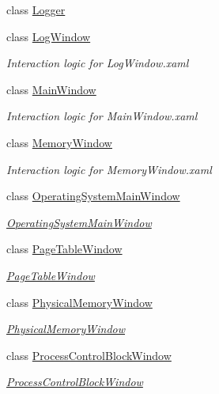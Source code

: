 \begin{DoxyCompactItemize}
class \hyperlink{class_c_p_u___o_s___simulator_1_1_logger}{Logger}
\item 
class \hyperlink{class_c_p_u___o_s___simulator_1_1_log_window}{Log\+Window}
\begin{DoxyCompactList}\small\item\em Interaction logic for Log\+Window.\+xaml \end{DoxyCompactList}\item 
class \hyperlink{class_c_p_u___o_s___simulator_1_1_main_window}{Main\+Window}
\begin{DoxyCompactList}\small\item\em Interaction logic for Main\+Window.\+xaml \end{DoxyCompactList}\item 
class \hyperlink{class_c_p_u___o_s___simulator_1_1_memory_window}{Memory\+Window}
\begin{DoxyCompactList}\small\item\em Interaction logic for Memory\+Window.\+xaml \end{DoxyCompactList}\item 
class \hyperlink{class_c_p_u___o_s___simulator_1_1_operating_system_main_window}{Operating\+System\+Main\+Window}
\begin{DoxyCompactList}\small\item\em \hyperlink{class_c_p_u___o_s___simulator_1_1_operating_system_main_window}{Operating\+System\+Main\+Window} \end{DoxyCompactList}\item 
class \hyperlink{class_c_p_u___o_s___simulator_1_1_page_table_window}{Page\+Table\+Window}
\begin{DoxyCompactList}\small\item\em \hyperlink{class_c_p_u___o_s___simulator_1_1_page_table_window}{Page\+Table\+Window} \end{DoxyCompactList}\item 
class \hyperlink{class_c_p_u___o_s___simulator_1_1_physical_memory_window}{Physical\+Memory\+Window}
\begin{DoxyCompactList}\small\item\em \hyperlink{class_c_p_u___o_s___simulator_1_1_physical_memory_window}{Physical\+Memory\+Window} \end{DoxyCompactList}\item 
class \hyperlink{class_c_p_u___o_s___simulator_1_1_process_control_block_window}{Process\+Control\+Block\+Window}
\begin{DoxyCompactList}\small\item\em \hyperlink{class_c_p_u___o_s___simulator_1_1_process_control_block_window}{Process\+Control\+Block\+Window} \end{DoxyCompactList}\item 

\end{DoxyCompactItemize}
